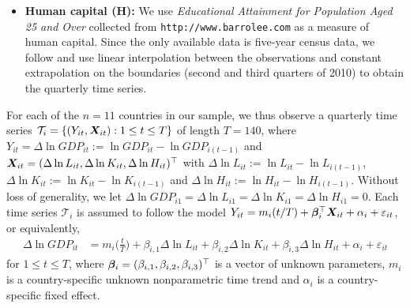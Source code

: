 \documentclass[12pt]{article}
\begin{document}
\begin{itemize}[leftmargin=0.5cm]
\item \textbf{Human capital ($\boldsymbol{H}$):} We use \textit{Educational Attainment for Population Aged 25 and Over} collected from \texttt{http://www.barrolee.com} as a measure of human capital. Since the only available data is five-year census data, we follow \cite{Zhang2012} and use linear interpolation between the observations and constant extrapolation on the boundaries (second and third quarters of 2010) to obtain the quarterly time series.
\end{itemize}


For each of the $n=11$ countries in our sample, we thus observe a quarterly time series $\mathcal{T}_i = \{(Y_{it}, \boldsymbol{X}_{it}): 1 \le t \le T \}$ of length $T = 140$, where $Y_{it} = \Delta \ln GDP_{it} := \ln GDP_{it} - \ln GDP_{i(t-1)}$ and $\boldsymbol{X}_{it} = (\Delta \ln L_{it}, \Delta \ln K_{it}, \Delta \ln H_{it})^\top$ with $\Delta \ln L_{it} := \ln L_{it} - \ln L_{i(t-1)}$, $\Delta \ln K_{it} := \ln K_{it} - \ln K_{i(t-1)}$ and $\Delta \ln H_{it} := \ln H_{it} - \ln H_{i(t-1)}$. Without loss of generality, we let $\Delta \ln GDP_{i1} = \Delta \ln L_{i1} = \Delta \ln K_{i1} = \Delta \ln H_{i1} = 0$. Each time series $\mathcal{T}_i$ is assumed to follow the model $Y_{it} = m_i(t/T) + \bm{\beta}^\top_i \boldsymbol{X}_{it} + \alpha_i + \varepsilon_{it}$, or equivalently,  
\begin{align}
\Delta \ln GDP_{it}
 & = m_i \Big( \frac{t}{T} \Big) + \beta_{i, 1} \Delta \ln L_{it} + \beta_{i, 2} \Delta \ln K_{it} + \beta_{i, 3} \Delta \ln H_{it} + \alpha_i + \varepsilon_{it} \label{eq:model:app}
\end{align}
for $1 \le t \le T$, where $\bm{\beta}_i = (\beta_{i, 1}, \beta_{i, 2}, \beta_{i, 3})^\top$ is a vector of unknown parameters, $m_i$ is a country-specific unknown nonparametric time trend and $\alpha_i$ is a country-specific fixed effect. 
\end{document}

